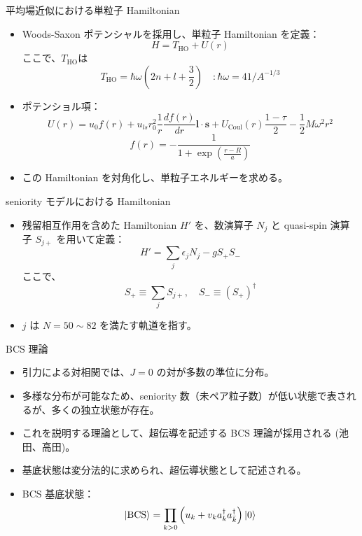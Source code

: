 \documentclass[aspectratio=169, 12pt, dvipdfmx]{beamer}
\begin{document}
\begin{frame}{平均場近似における単粒子 Hamiltonian}
  \begin{itemize}
    \item Woods-Saxon ポテンシャルを採用し、単粒子 Hamiltonian を定義：
      \[
      H = T_{\text{HO}} + U(r)
      \]
      ここで、\(T_{\text{HO}}\)は  
      \[
      T_{\text{HO}} = \hbar \omega \left( 2n + l + \frac{3}{2} \right)\quad:\hbar\omega=41/A^{-1/3}
      \]
    \item ポテンショル項：
      \[
      U(r) = u_0 f(r) + u_{ls} r_0^2 \frac{1}{r} \frac{df(r)}{dr} \boldsymbol{l} \cdot \boldsymbol{s}
      + U_{\text{Coul}}(r) \frac{1 - \tau}{2}-\frac{1}{2}M\omega^2r^2
      \]
      \[
      f(r) = -\frac{1}{1 + \exp \left( \frac{r - R}{a} \right)}
      \]
    \item この Hamiltonian を対角化し、単粒子エネルギーを求める。
  \end{itemize}
\end{frame}


\begin{frame}{seniority モデルにおける Hamiltonian}
  \begin{itemize}
    \item 残留相互作用を含めた Hamiltonian \( H' \) を、数演算子 \( N_j \) と quasi-spin 演算子 \( S_{j+} \) を用いて定義：
      \[
      H' = \sum_j \epsilon_j N_j - g S_{+} S_{-}
      \]
      ここで、
      \[
      S_{+} \equiv \sum_j S_{j+}, \quad S_{-} \equiv (S_{+})^\dagger
      \]
    \item \( j \) は \( N = 50 \sim 82 \) を満たす軌道を指す。
  \end{itemize}
\end{frame}



\begin{frame}{BCS 理論}
  \begin{itemize}
    \item 引力による対相関では、\( J=0 \) の対が多数の準位に分布。
    \item 多様な分布が可能なため、seniority 数（未ペア粒子数）が低い状態で表されるが、多くの独立状態が存在。
    \item これを説明する理論として、超伝導を記述する BCS 理論が採用される \cite{asakura_structure}(池田、高田)。
    \item 基底状態は変分法的に求められ、超伝導状態として記述される。
    \item BCS 基底状態：
      \[
      \ket{\text{BCS}} = \prod_{k>0} \left( u_k + v_k a^{\dagger}_{k} a^{\dagger}_{\bar{k}} \right) \ket{0}
      \]
  \end{itemize}
\end{frame}
\end{document}
